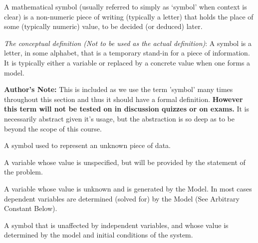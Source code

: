 \documentclass{ximera}
\begin{document}
\begin{definition}
    A mathematical symbol (usually referred to simply as `symbol' when context is clear) is a non-numeric piece of writing (typically a letter) that holds the place of some (typically numeric) value, to be decided (or deduced) later.
    
        \emph{The conceptual definition (Not to be used as the actual definition)}: A symbol is a letter, in some alphabet, that is a temporary stand-in for a piece of information. It is typically either a variable or replaced by a concrete value when one forms a model.
        
        \textbf{Author's Note:} This is included as we use the term 'symbol' many times throughout this section and thus it should have a formal definition. \textbf{However this term will not be tested on in discussion quizzes or on exams.} It is necessarily abstract given it's usage, but the abstraction is so deep as to be beyond the scope of this course.
\end{definition}

\begin{definition}[Variable]
    A symbol used to represent an unknown piece of data.
\end{definition}

\begin{definition}
    A variable whose value is unspecified, but will be provided by the statement of the problem.
\end{definition}

\begin{definition}
    A variable whose value is unknown and is generated by the Model. In most cases dependent variables are determined (solved for) by the Model (See Arbitrary Constant Below).
\end{definition}

\begin{definition}
    A symbol that is unaffected by independent variables, and whose value is determined by the model and initial conditions of the system.
\end{definition}
\end{document}
